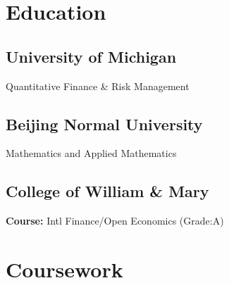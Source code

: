 \documentclass[letterpaper]{deedy-resume} %
\begin{document}
\begin{minipage}[t]{0.33\textwidth} %


\section{Education} 

\subsection{University of Michigan}

Quantitative Finance \& Risk Management\\


\sectionspace %


\subsection{Beijing Normal University}

Mathematics and Applied Mathematics \\


\sectionspace %



\subsection{College of William \& Mary}

{\bf Course: }  Intl Finance/Open Economics (Grade:A)\\


\sectionspace %



\section{Coursework}


\end{minipage}
\end{document}

